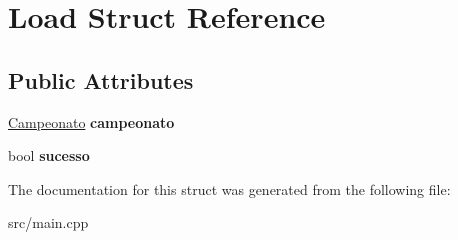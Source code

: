 \hypertarget{struct_load}{}\section{Load Struct Reference}
\label{struct_load}
\subsection*{Public Attributes}
\begin{DoxyCompactItemize}
\item 
\hypertarget{struct_load_ad3c5c6771ce0e7403bd30c6459a69911}{}\hyperlink{class_campeonato}{Campeonato} {\bfseries campeonato}\label{struct_load_ad3c5c6771ce0e7403bd30c6459a69911}

\item 
\hypertarget{struct_load_af924852de1fd27b1cbcb2d1dae52e583}{}bool {\bfseries sucesso}\label{struct_load_af924852de1fd27b1cbcb2d1dae52e583}

\end{DoxyCompactItemize}


The documentation for this struct was generated from the following file\+:\begin{DoxyCompactItemize}
\item 
src/main.\+cpp\end{DoxyCompactItemize}
